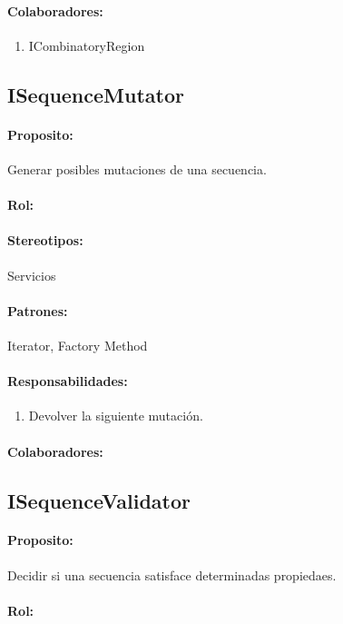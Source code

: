 \documentclass[a4paper,10pt]{article}
\begin{document}
    \paragraph{Colaboradores:}
      \begin{enumerate}
       \item ICombinatoryRegion
      \end{enumerate}

  \subsection{ISequenceMutator}
    \paragraph{Proposito:} Generar posibles mutaciones de una secuencia.
    \paragraph{Rol:}
    \paragraph{Stereotipos:} Servicios
    \paragraph{Patrones:} Iterator, Factory Method
    \paragraph{Responsabilidades:}
      \begin{enumerate}
       \item Devolver la siguiente mutaci\'on.
      \end{enumerate}
    \paragraph{Colaboradores:}

  \subsection{ISequenceValidator}
    \paragraph{Proposito:} Decidir si una secuencia satisface determinadas
propiedaes.
    \paragraph{Rol:}
\end{document}
